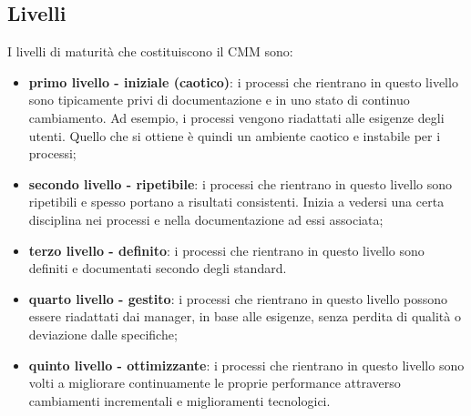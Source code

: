 \documentclass[PianoDiQualifica.tex]{subfiles}
\begin{document}
	\subsection{Livelli}
	I livelli di maturità che costituiscono il CMM sono:
	\begin{itemize}
		\item \textbf{primo livello - iniziale (caotico)}: i processi che rientrano in questo livello sono tipicamente privi di documentazione e in uno stato di
		continuo cambiamento. Ad esempio, i processi vengono riadattati alle esigenze degli utenti. Quello che si ottiene è quindi un
		ambiente caotico e instabile per i processi;
		\item \textbf{secondo livello - ripetibile}:  i processi che rientrano in questo livello sono ripetibili e spesso portano a risultati consistenti.
		Inizia a vedersi una certa disciplina nei processi e nella documentazione ad essi associata;
		\item \textbf{terzo livello - definito}: i processi che rientrano in questo livello sono definiti e documentati secondo degli standard.
		\item \textbf{quarto livello - gestito}: i processi che rientrano in questo livello possono essere riadattati dai manager, in base alle esigenze, senza
		perdita di qualità o deviazione dalle specifiche;
		\item \textbf{quinto livello - ottimizzante}: i processi che rientrano in questo livello sono volti a migliorare continuamente le proprie
		performance attraverso cambiamenti incrementali e miglioramenti tecnologici.
	\end{itemize}
\end{document}
